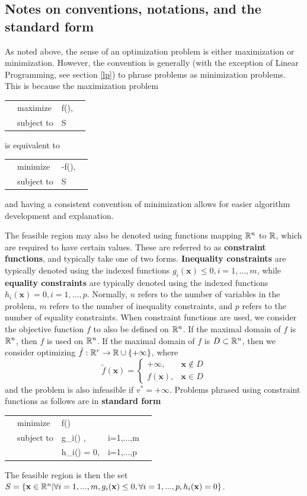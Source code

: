 \documentclass[10pt]{article}
\renewcommand{\vec}[1]{\mathbf{#1}}
\newcommand{\R}[1][]{ \ifx&#1& \mathbb{R} \else \mathbb{R}^{#1} \fi }
\newcommand{\x}{\vec{x}}
\begin{document}
\subsection{Notes on conventions, notations, and the standard form}
As noted above, the sense of an optimization problem is either maximization or minimization. However, the convention is generally (with the exception of Linear Programming, see section \ref{lp}) to phrase problems as minimization problems. This is because the maximization problem

\begin{tabularx}{\textwidth}{X l L X}
	& maximize		& f(\x),	& \\
	& subject to	& \x\in S	&
\end{tabularx}
is equivalent\cite{boyd} to

\begin{tabularx}{\textwidth}{X l L X}
	& minimize		& -f(\x),	& \\
	& subject to	& \x\in S	&
\end{tabularx}
and having a consistent convention of minimization allows for easier algorithm development and explanation.

The feasible region may also be denoted using functions mapping $\R[n]$ to $\R$, which are required to have certain values. These are referred to as \textbf{constraint functions}, and typically take one of two forms. \textbf{Inequality constraints} are typically denoted using the indexed functions $g_i(\x) \leq 0, i=1,...,m$, while \textbf{equality constraints} are typically denoted using the indexed functions $h_i(\x)=0,i=1,...,p$. Normally, $n$ refers to the number of variables in the problem, $m$ refers to the number of inequality constraints, and $p$ refers to the number of equality constraints. When constraint functions are used, we consider the objective function $f$ to also be defined on $\R[n]$. If the maximal domain of $f$ is $\R[n]$, then $f$ is used on $\R[n]$. If the maximal domain of $f$ is $D\subset\R[n]$, then we consider optimizing $\tilde{f}:\R[r]\to\R\cup\{+\infty\}$, where 
\[
\tilde{f}(\x) = \begin{cases}+\infty, & \x\notin D\\f(\x), & \x\in D\end{cases}
\]
and the problem is also infeasible if $v^*=+\infty$. Problems phrased using constraint functions as follows are in \textbf{standard form}\cite{boyd}
\\
\begin{tabularx}{\textwidth}{X l L L X}
	& minimize		& f(\x) 			& 			& \\
	& subject to	& g_i(\x) ,	& i=1,...,m	& \\
	&				& h_i(\x) = 0,		& i=1,...,p &
\end{tabularx}
The feasible region is then the set $S = \{\x\in\R[n]|\forall i=1,...,m, g_i(\x)\leq0, \forall i=1,...,p, h_i(\x)=0\}$.\\
\end{document}
